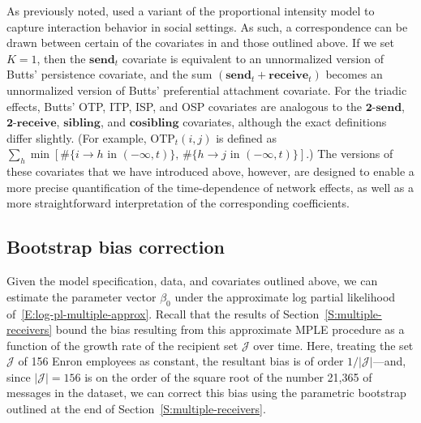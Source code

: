 \documentclass[final]{statsoc}
\begin{document}
As previously noted, \cite{butts2008relational} used a variant of the proportional
intensity model to capture interaction behavior in social settings.  As such, a correspondence can be drawn between certain of the covariates in \cite{butts2008relational} and those outlined above.  If we set
$K = 1$, then the $\textbf{send}_t$ covariate is equivalent to an unnormalized version
of Butts' persistence covariate, and the sum $(\textbf{send}_t +
\textbf{receive}_t)$ becomes an unnormalized version of Butts' preferential
attachment covariate.  For the triadic effects, Butts' OTP, ITP, ISP, and OSP
covariates are analogous to the $\textbf{2-send}$, $\textbf{2-receive}$,
$\textbf{sibling}$, and $\textbf{cosibling}$ covariates, although the exact definitions differ slightly.
(For example, $\textrm{OTP}_t(i,j)$ is
defined as $\sum_{h} \min[ \#\{ i \to h \text{ in } (-\infty, t) \}, \,
\#\{ h \to j \text{ in } (-\infty, t) \} ]$.)  The versions of these covariates that we have introduced above, however, are designed to enable a more precise quantification of the time-dependence of network effects, as well as a more straightforward interpretation of the corresponding coefficients.


\subsection{Bootstrap bias correction}\label{S:enron-bootstrap}

Given the model specification, data, and covariates outlined above, we can
estimate the parameter vector $\beta_0$ under the approximate
log partial likelihood of~\eqref{E:log-pl-multiple-approx}.  Recall
that the results of Section~\ref{S:multiple-receivers} bound the bias
resulting from this approximate MPLE procedure as a function of the growth
rate of the recipient set $\mathcal{J}$ over time.  Here, treating the
set $\mathcal{J}$ of 156 Enron employees as constant, the resultant bias
is of order $1/|\mathcal{J}|$---and, since $|\mathcal{J}| = 156$ is on the
order of the square root of the number 21,365 of messages in the dataset,
we can correct this bias using the parametric bootstrap outlined at the
end of Section~\ref{S:multiple-receivers}.
\end{document}
